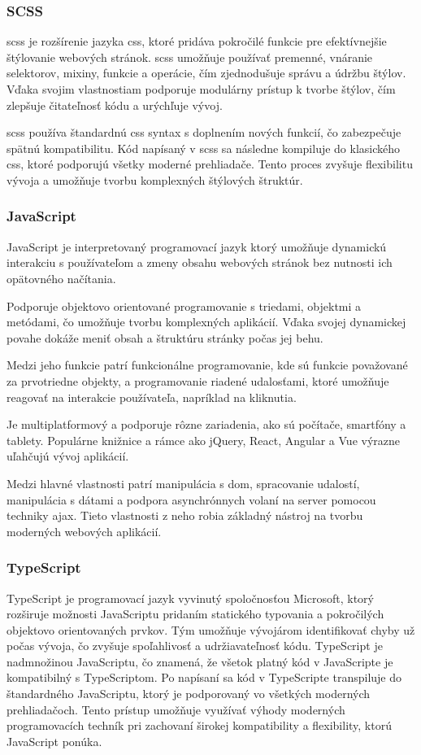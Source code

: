 \subsubsection{SCSS}
\acrfull{scss} \cite{scss} je rozšírenie jazyka \acrshort{css}, ktoré pridáva pokročilé funkcie pre efektívnejšie štýlovanie webových stránok. 
\acrshort{scss} umožňuje používať premenné, vnáranie selektorov, mixiny, funkcie a operácie, čím zjednodušuje správu a údržbu štýlov.
 Vďaka svojim vlastnostiam podporuje modulárny prístup k tvorbe štýlov, čím zlepšuje čitateľnosť kódu a urýchľuje vývoj.

 \acrshort{scss} používa štandardnú \acrshort{css} syntax s doplnením nových funkcií, čo zabezpečuje spätnú kompatibilitu.
 Kód napísaný v \acrshort{scss} sa následne kompiluje do klasického \acrshort{css}, ktoré podporujú všetky moderné prehliadače. 
Tento proces zvyšuje flexibilitu vývoja a umožňuje tvorbu komplexných štýlových štruktúr.
\subsubsection{JavaScript}
JavaScript \cite{JavaScript} je interpretovaný programovací jazyk ktorý umožňuje dynamickú interakciu s používateľom a zmeny obsahu webových stránok bez nutnosti ich opätovného načítania.

Podporuje objektovo orientované programovanie s triedami, objektmi a metódami, čo umožňuje tvorbu komplexných aplikácií. Vďaka svojej dynamickej povahe dokáže meniť obsah a štruktúru stránky počas jej behu.

Medzi jeho funkcie patrí funkcionálne programovanie, kde sú funkcie považované za prvotriedne objekty, a programovanie riadené udalosťami, ktoré umožňuje reagovať na interakcie používateľa, napríklad na kliknutia.

Je multiplatformový a podporuje rôzne zariadenia, ako sú počítače, smartfóny a tablety. Populárne knižnice a rámce ako jQuery, React, Angular a Vue výrazne uľahčujú vývoj aplikácií.

Medzi hlavné vlastnosti patrí manipulácia s \acrfull{dom}, spracovanie udalostí, manipulácia s dátami a podpora asynchrónnych volaní na server pomocou techniky \acrfull{ajax}.
 Tieto vlastnosti z neho robia základný nástroj na tvorbu moderných webových aplikácií.
\subsubsection{TypeScript}
TypeScript \cite{TypeScript} je programovací jazyk vyvinutý spoločnosťou Microsoft, ktorý rozširuje možnosti JavaScriptu pridaním statického typovania a pokročilých objektovo orientovaných prvkov.
 Tým umožňuje vývojárom identifikovať chyby už počas vývoja, čo zvyšuje spoľahlivosť a udržiavateľnosť kódu.
  TypeScript je nadmnožinou JavaScriptu, čo znamená, že všetok platný kód v JavaScripte je kompatibilný s TypeScriptom.
   Po napísaní sa kód v TypeScripte transpiluje do štandardného JavaScriptu, ktorý je podporovaný vo všetkých moderných prehliadačoch. 
   Tento prístup umožňuje využívať výhody moderných programovacích techník pri zachovaní širokej kompatibility a flexibility, ktorú JavaScript ponúka.
